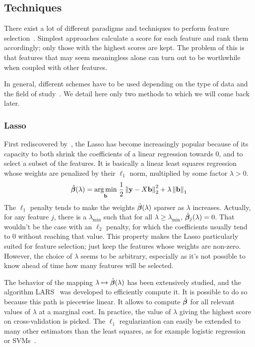 \subsection{Techniques}\label{subsec:fst}

There exist a lot of different paradigms and techniques
to perform feature selection~\citep{intro_fs, fs_for_classification_a_review}.
Simplest approaches calculate a score for each feature and rank them accordingly;
only those with the highest scores are kept.
The problem of this is that features that may seem meaningless alone
can turn out to be worthwhile when coupled with other features.

In general,
different schemes have to be used depending
on the type of data and the field of study~\citep{fs_text_classification, gene_selection_cancer_svm, fs_for_classification}.
We detail here only two methods to which we will come back later.

\subsubsection{Lasso}\label{subsubsec:lasso}

First rediscovered by~\cite{lasso},
the Lasso has become increasingly popular because of its capacity to both shrink
the coefficients of a linear regression towards $0$, and to select a subset of the features.
It is basically a linear least squares regression whose weights are penalized by their $\ell_1$ norm,
multiplied by some factor $\lambda > 0$.
%
\begin{equation}\label{eq:lasso}
    \hat{\bm{\beta}}(\lambda) =
    \underset{\mathbf{b}}{\operatorname*{arg\,min}}\;
    \frac{1}{2}\left\lVert\mathbf{y} - X\mathbf{b}\right\rVert_2^2 + \lambda\left\lVert\mathbf{b}\right\rVert_1
\end{equation}
%
The $\ell_1$ penalty tends to make the weights $\hat{\bm{\beta}}(\lambda)$ sparser as $\lambda$ increases.
Actually, for any feature $j$,
there is a $\lambda_{\min}$ such that for all $\lambda \geq \lambda_{\min}$,
$\hat{\bm{\beta}}_j(\lambda) = 0$.
That wouldn't be the case with an $\ell_2$ penalty,
for which the coefficients usually tend to $0$ without reaching that value.
This property makes the Lasso particularly suited for feature selection;
just keep the features whose weights are non-zero.
However, the choice of $\lambda$ seems to be arbitrary,
especially as it's not possible to know ahead of time how many features will be selected.

The behavior of the mapping $\lambda \mapsto \hat{\bm{\beta}}(\lambda)$ has been extensively studied,
and the algorithm LARS~\citep{lars} was developed to efficiently compute it.
It is possible to do so because this path is piecewise linear.
It allows to compute $\hat{\bm{\beta}}$ for all relevant values of $\lambda$ at a marginal cost.
In practice, the value of $\lambda$ giving the highest score on cross-validation is picked.
The $\ell_1$ regularization can easily be extended to many other estimators than the least squares,
as for example logistic regression~\citep{logistic_regression} or SVMs~\citep{svm}.

